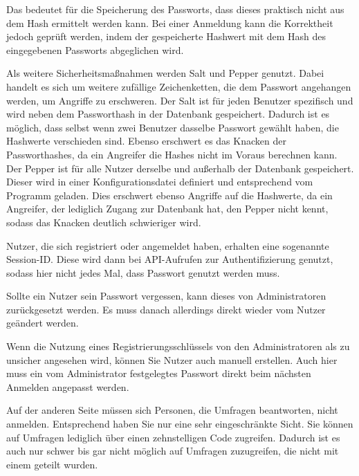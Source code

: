 Das bedeutet für die Speicherung des Passworts, dass dieses praktisch nicht aus dem Hash ermittelt werden kann.
Bei einer Anmeldung kann die Korrektheit jedoch geprüft werden, indem der gespeicherte Hashwert mit dem Hash des eingegebenen Passworts abgeglichen wird.

Als weitere Sicherheitsmaßnahmen werden Salt und Pepper genutzt.
Dabei handelt es sich um weitere zufällige Zeichenketten, die dem Passwort angehangen werden, um Angriffe zu erschweren.
Der Salt ist für jeden Benutzer spezifisch und wird neben dem Passworthash in der Datenbank gespeichert.
Dadurch ist es möglich, dass selbst wenn zwei Benutzer dasselbe Passwort gewählt haben, die Hashwerte verschieden sind.
Ebenso erschwert es das Knacken der Passworthashes, da ein Angreifer die Hashes nicht im Voraus berechnen kann.
Der Pepper ist für alle Nutzer derselbe und außerhalb der Datenbank gespeichert.
Dieser wird in einer Konfigurationsdatei definiert und entsprechend vom Programm geladen.
Dies erschwert ebenso Angriffe auf die Hashwerte, da ein Angreifer, der lediglich Zugang zur Datenbank hat, den Pepper nicht kennt, sodass das Knacken deutlich schwieriger wird.

Nutzer, die sich registriert oder angemeldet haben, erhalten eine sogenannte Session-ID.
Diese wird dann bei \acs{API}-Aufrufen zur Authentifizierung genutzt, sodass hier nicht jedes Mal, dass Passwort genutzt werden muss.

Sollte ein Nutzer sein Passwort vergessen, kann dieses von Administratoren zurückgesetzt werden.
Es muss danach allerdings direkt wieder vom Nutzer geändert werden.

Wenn die Nutzung eines Registrierungsschlüssels von den Administratoren als zu unsicher angesehen wird, können Sie Nutzer auch manuell erstellen.
Auch hier muss ein vom Administrator festgelegtes Passwort direkt beim nächsten Anmelden angepasst werden.

Auf der anderen Seite müssen sich Personen, die Umfragen beantworten, nicht anmelden.
Entsprechend haben Sie nur eine sehr eingeschränkte Sicht.
Sie können auf Umfragen lediglich über einen zehnstelligen Code zugreifen.
Dadurch ist es auch nur schwer bis gar nicht möglich auf Umfragen zuzugreifen, die nicht mit einem geteilt wurden.
